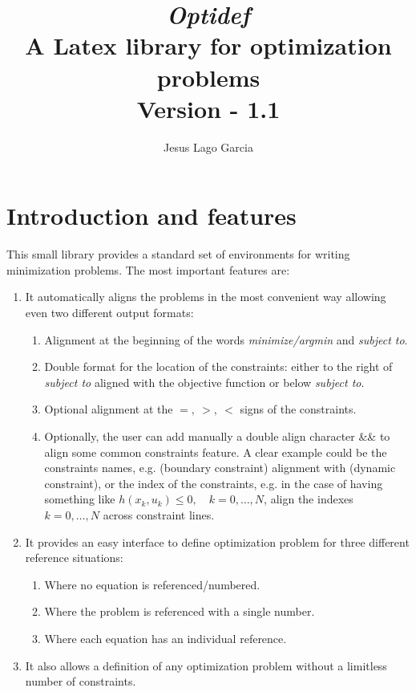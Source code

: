 \documentclass[]{report}
\title{\textit{\textbf{Optidef}} \\ A Latex library for optimization problems\\ \textnormal{Version - 1.1}}
\author{Jesus Lago Garcia}
\begin{document}
\maketitle

\section{Introduction and features}

This small library provides a standard set of environments for writing minimization problems. The most important features are:
\begin{enumerate}
	\item It automatically aligns the problems in the most convenient way allowing even two different output formats:
		\begin{enumerate}
			\item Alignment at the beginning of the words \textit{minimize/argmin} and \textit{subject to}.
			\item Double format for the location of the constraints: either to the right of  \textit{subject to} aligned with the objective function or below \textit{subject to}.
			\item Optional alignment at the $=,~>,~<$ signs of the constraints.
			\item Optionally, the user can add manually a double align character \&\& to align some common constraints feature. A clear example could be the constraints names, e.g. (boundary constraint) alignment with (dynamic constraint), or the index of the constraints, e.g. in the case of having something like $h(x_k,u_k)\leq 0,\quad k=0,\ldots,N$, align the indexes $k=0,\ldots,N$ across constraint lines.
		\end{enumerate}

\item It provides an easy interface to define optimization problem for three different reference situations:
\begin{enumerate}
	\item Where no equation is referenced/numbered.
	\item Where the problem is referenced with a single number.
	\item Where each equation has an individual reference.
\end{enumerate} 

\item It also allows a definition of any optimization problem without a limitless number of constraints.

\end{enumerate}
\end{document}

